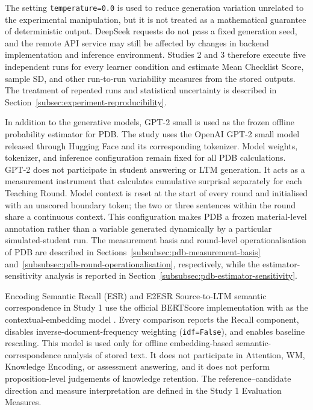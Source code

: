 The setting \texttt{temperature=0.0} is used to reduce generation variation unrelated to the experimental manipulation, but it is not treated as a mathematical guarantee of deterministic output. DeepSeek requests do not pass a fixed generation seed, and the remote API service may still be affected by changes in backend implementation and inference environment. Studies 2 and 3 therefore execute five independent runs for every learner condition and estimate Mean Checklist Score, sample SD, and other run-to-run variability measures from the stored outputs. The treatment of repeated runs and statistical uncertainty is described in Section~\ref{subsec:experiment-reproducibility}.

In addition to the generative models, GPT-2 small is used as the frozen offline probability estimator for PDB. The study uses the OpenAI GPT-2 small model released through Hugging Face and its corresponding tokenizer. Model weights, tokenizer, and inference configuration remain fixed for all PDB calculations. GPT-2 does not participate in student answering or LTM generation. It acts as a measurement instrument that calculates cumulative surprisal separately for each Teaching Round. Model context is reset at the start of every round and initialised with an unscored boundary token; the two or three sentences within the round share a continuous context. This configuration makes PDB a frozen material-level annotation rather than a variable generated dynamically by a particular simulated-student run. The measurement basis and round-level operationalisation of PDB are described in Sections~\ref{subsubsec:pdb-measurement-basis} and~\ref{subsubsec:pdb-round-operationalisation}, respectively, while the estimator-sensitivity analysis is reported in Section~\ref{subsubsec:pdb-estimator-sensitivity}.

Encoding Semantic Recall (ESR) and E2ESR Source-to-LTM semantic correspondence in Study 1 use the official BERTScore implementation with  as the contextual-embedding model \cite{zhang2019bertscore}. Every comparison reports the Recall component, disables inverse-document-frequency weighting (\texttt{idf=False}), and enables baseline rescaling. This model is used only for offline embedding-based semantic-correspondence analysis of stored text. It does not participate in Attention, WM, Knowledge Encoding, or assessment answering, and it does not perform proposition-level judgements of knowledge retention. The reference--candidate direction and measure interpretation are defined in the Study 1 Evaluation Measures.

